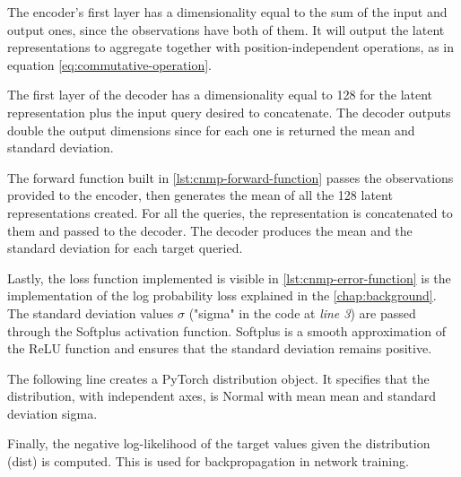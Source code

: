 The encoder's first layer has a dimensionality equal to the sum of the input and output ones, since the observations have both of them. It will output the latent representations to aggregate together with position-independent operations, as in equation \ref{eq:commutative-operation}. 

The first layer of the decoder has a dimensionality equal to 128 for the latent representation plus the input query desired to concatenate. The decoder outputs double the output dimensions since for each one is returned the mean and standard deviation. 



The forward function built in \cref{lst:cnmp-forward-function} passes the observations provided to the encoder, then generates the mean of all the 128 latent representations created. For all the queries, the representation is concatenated to them and passed to the decoder. The decoder produces the mean and the standard deviation for each target queried. 



Lastly, the loss function implemented is visible in \cref{lst:cnmp-error-function} is the implementation of the log probability loss explained in the \cref{chap:background}. The standard deviation values $\sigma$ ("sigma" in the code at \emph{line 3}) are passed through the Softplus activation function. Softplus is a smooth approximation of the ReLU function and ensures that the standard deviation remains positive. 

The following line creates a PyTorch distribution object. It specifies that the distribution, with independent axes, is Normal with mean mean and standard deviation sigma. 

Finally, the negative log-likelihood of the target values given the distribution (dist) is computed. This is used for backpropagation in network training. 







\newpage
